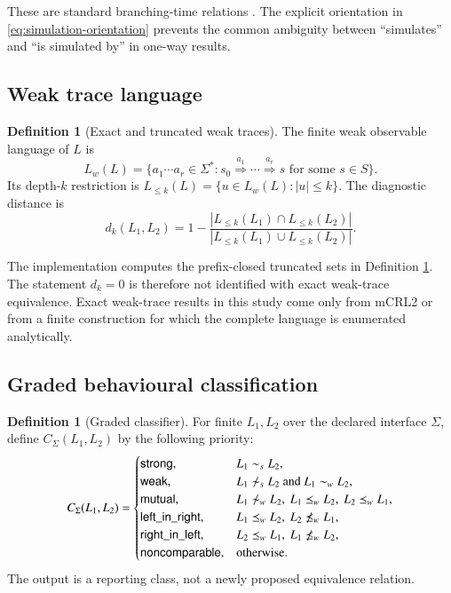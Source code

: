 \documentclass[JMCS,submit]{resources/ISRP}
\theoremstyle{definition}
\newtheorem{definition}[theorem]{Definition}
\theoremstyle{remark}
\numberwithin{equation}{section}
\newcommand{\xRightarrow}[1]{\stackrel{#1}{\Longrightarrow}}
\newcommand{\strongsim}{\mathrel{\sim_{s}}}
\newcommand{\weaksim}{\mathrel{\sim_{w}}}
\newcommand{\weakpre}{\mathrel{\preceq_{w}}}
\begin{document}
These are standard branching-time relations \cite{Milner1989,Sangiorgi2011}.
The explicit orientation in \eqref{eq:simulation-orientation} prevents the common
ambiguity between ``simulates'' and ``is simulated by'' in one-way results.

\subsection{Weak trace language}\label{sec:trace-language}

\begin{definition}[Exact and truncated weak traces]\label{def:weak-traces}
The finite weak observable language of $L$ is
\begin{equation}\label{eq:exact-language}
 L_w(L)=\{a_1\cdots a_r\in\Sigma^*:s_0
 \xRightarrow{a_1}\cdots\xRightarrow{a_r}s
 \text{ for some }s\in S\}.
\end{equation}
Its depth-$k$ restriction is
$L_{\leq k}(L)=\{u\in L_w(L):|u|\leq k\}$. The diagnostic distance is
\begin{equation}\label{eq:distance}
d_k(L_1,L_2)=1-
\frac{|L_{\leq k}(L_1)\cap L_{\leq k}(L_2)|}
{|L_{\leq k}(L_1)\cup L_{\leq k}(L_2)|}.
\end{equation}
\end{definition}

The implementation computes the prefix-closed truncated sets in Definition
\ref{def:weak-traces}. The statement $d_k=0$ is therefore not identified with
exact weak-trace equivalence. Exact weak-trace results in this study come only
from mCRL2 or from a finite construction for which the complete language is
enumerated analytically.

\subsection{Graded behavioural classification}\label{sec:decision}

\begin{definition}[Graded classifier]\label{def:classifier}
For finite $L_1,L_2$ over the declared interface $\Sigma$, define
$C_{\Sigma}(L_1,L_2)$ by the following priority:
\begin{equation}\label{eq:classifier}
C_{\Sigma}(L_1,L_2)=
\begin{cases}
\mathsf{strong}, & L_1\strongsim L_2,\\
\mathsf{weak}, & L_1\not\strongsim L_2\text{ and }L_1\weaksim L_2,\\
\mathsf{mutual}, & L_1\not\weaksim L_2,\ L_1\weakpre L_2,\ L_2\weakpre L_1,\\
\mathsf{left\_in\_right}, & L_1\weakpre L_2,\ L_2\not\weakpre L_1,\\
\mathsf{right\_in\_left}, & L_2\weakpre L_1,\ L_1\not\weakpre L_2,\\
\mathsf{noncomparable}, & \text{otherwise}.
\end{cases}
\end{equation}
The output is a reporting class, not a newly proposed equivalence relation.
\end{definition}
\end{document}
